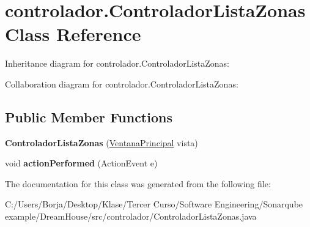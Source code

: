 \hypertarget{classcontrolador_1_1_controlador_lista_zonas}{}\section{controlador.\+Controlador\+Lista\+Zonas Class Reference}
\label{classcontrolador_1_1_controlador_lista_zonas}


Inheritance diagram for controlador.\+Controlador\+Lista\+Zonas\+:


Collaboration diagram for controlador.\+Controlador\+Lista\+Zonas\+:
\subsection*{Public Member Functions}
\begin{DoxyCompactItemize}
\item 
\mbox{\label{classcontrolador_1_1_controlador_lista_zonas_ace36c2e2e48aae483239b91ccc33d580}} 
{\bfseries Controlador\+Lista\+Zonas} (\mbox{\hyperlink{classvista_1_1_ventana_principal}{Ventana\+Principal}} vista)
\item 
\mbox{\label{classcontrolador_1_1_controlador_lista_zonas_a3daf75a60ff207317353b31ac649d147}} 
void {\bfseries action\+Performed} (Action\+Event e)
\end{DoxyCompactItemize}


The documentation for this class was generated from the following file\+:\begin{DoxyCompactItemize}
\item 
C\+:/\+Users/\+Borja/\+Desktop/\+Klase/\+Tercer Curso/\+Software Engineering/\+Sonarqube example/\+Dream\+House/src/controlador/Controlador\+Lista\+Zonas.\+java\end{DoxyCompactItemize}
